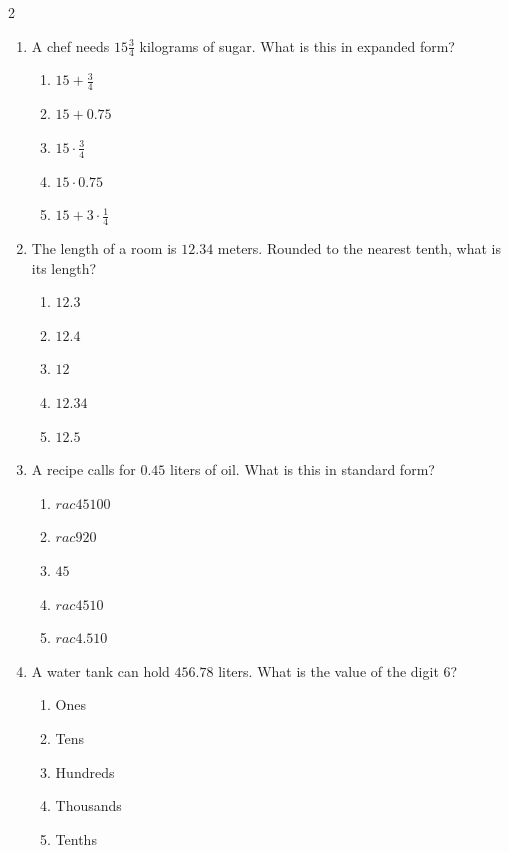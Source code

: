 \documentclass[10pt]{article}
\begin{document}
\begin{multicols}{2}
\begin{enumerate}[label=\textbf{Q\arabic*.}, leftmargin=*, itemsep=6pt, parsep=0pt]
  \item \small A chef needs $15 \frac{3}{4}$ kilograms of sugar. What is this in expanded form?
  \begin{enumerate}[label=(\Alph*), leftmargin=0.6cm, nosep, itemsep=2pt]
    \item $15 + \frac{3}{4}$
    \item $15 + 0.75$
    \item $15 \cdot \frac{3}{4}$
    \item $15 \cdot 0.75$
    \item $15 + 3 \cdot \frac{1}{4}$
  \end{enumerate}

  \item \small The length of a room is $12.34$ meters. Rounded to the nearest tenth, what is its length?
  \begin{enumerate}[label=(\Alph*), leftmargin=0.6cm, nosep, itemsep=2pt]
    \item $12.3$
    \item $12.4$
    \item $12$
    \item $12.34$
    \item $12.5$
  \end{enumerate}

  \item \small A recipe calls for $0.45$ liters of oil. What is this in standard form?
  \begin{enumerate}[label=(\Alph*), leftmargin=0.6cm, nosep, itemsep=2pt]
    \item $rac{45}{100}$
    \item $rac{9}{20}$
    \item $45$
    \item $rac{45}{10}$
    \item $rac{4.5}{10}$
  \end{enumerate}

  \item \small A water tank can hold $456.78$ liters. What is the value of the digit 6?
  \begin{enumerate}[label=(\Alph*), leftmargin=0.6cm, nosep, itemsep=2pt]
    \item Ones
    \item Tens
    \item Hundreds
    \item Thousands
    \item Tenths
  \end{enumerate}


\end{enumerate}
\end{multicols}
\end{document}
